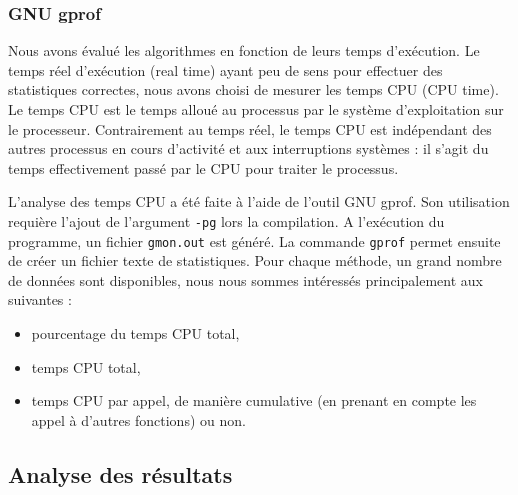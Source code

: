 \subsubsection{GNU gprof}
Nous avons évalué les algorithmes en fonction de leurs temps d'exécution. Le temps réel d'exécution (real time) ayant peu de sens pour effectuer des statistiques correctes, nous avons choisi de mesurer les temps CPU (CPU time). Le temps CPU est le temps alloué au processus par le système d'exploitation sur le processeur. Contrairement au temps réel, le temps CPU est indépendant des autres processus en cours d'activité et aux interruptions systèmes : il s'agit du temps effectivement passé par le CPU pour traiter le processus.

L'analyse des temps CPU a été faite à l'aide de l'outil GNU gprof. Son utilisation requière l'ajout de l'argument \texttt{-pg} lors la compilation. A l'exécution du programme, un fichier \texttt{gmon.out} est généré. La commande \texttt{gprof} permet ensuite de créer un fichier texte de statistiques. Pour chaque méthode, un grand nombre de données sont disponibles, nous nous sommes intéressés principalement aux suivantes :
\begin{itemize}
\item pourcentage du temps CPU total,
\item temps CPU total,
\item temps CPU par appel, de manière cumulative (en prenant en compte les appel à d'autres fonctions) ou non.
\end{itemize}

\subsection{Analyse des résultats}